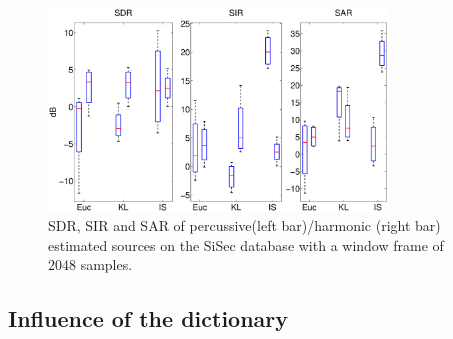 \begin{figure}[t]

  \centering 
  \includegraphics[width=9cm]{fig/NewDictDivTest}
  \caption{\label{frame2048} SDR, SIR and SAR of percussive(left bar)/harmonic (right bar) estimated sources on the SiSec database with a window frame of $2048$ samples.}
  
\end{figure}



\subsection{Influence of the dictionary}
\label{setup:dictionary}


